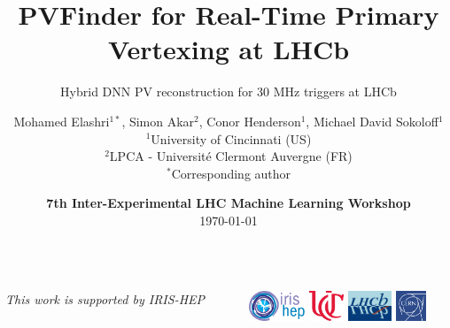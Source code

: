 \documentclass[10pt,aspectratio=169]{beamer}
\title{PVFinder for Real-Time Primary Vertexing at LHCb}
\subtitle{Hybrid DNN PV reconstruction for 30 MHz triggers at LHCb}
\author{Mohamed Elashri$^{1*}$, Simon Akar$^2$, Conor Henderson$^1$, Michael David Sokoloff$^1$ \\[0.3cm]
        {\small $^1$University of Cincinnati (US)} \\
        {\small $^2$LPCA - Université Clermont Auvergne (FR)} \\
        {\small $^*$Corresponding author}}
\date{\textbf{7th Inter-Experimental LHC Machine Learning Workshop} \\[0.2cm] \today}
\begin{document}
\begin{frame}
  \titlepage
  
  \vspace{-2cm}
  
  \begin{columns}[b]
    \begin{column}{0.55\textwidth}
      \raggedright
      {\footnotesize \textit{This work is supported by IRIS-HEP}}
    \end{column}
    
    \begin{column}{0.45\textwidth}
      \raggedleft
      \includegraphics[height=0.9cm]{figures/iris-hep-logo.png} \;
      \includegraphics[height=0.9cm]{figures/uc-logo.png} \;
      \includegraphics[height=0.9cm]{figures/lhcb-logo.jpg} \;
      \includegraphics[height=0.9cm]{figures/cern-logo.png}
    \end{column}
  \end{columns}
  
  \vspace{0.3cm}
\end{frame}
\end{document}
